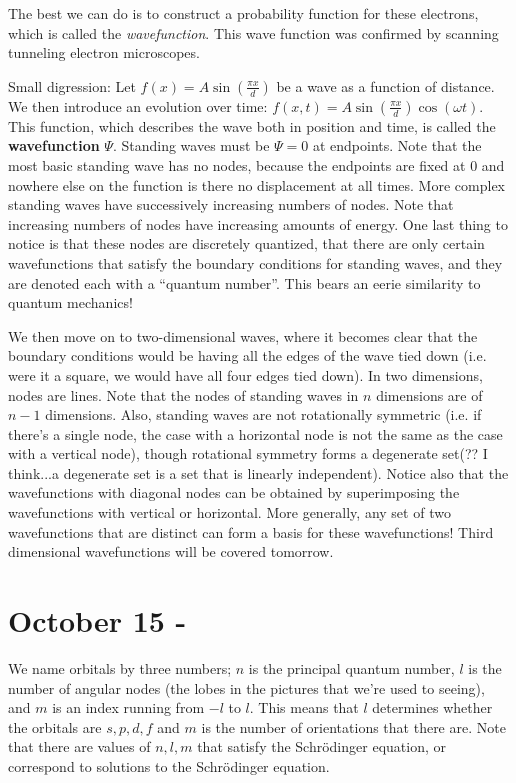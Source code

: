 \documentclass{report}
\begin{document}
The best we can do is to construct a probability function for these electrons, which is called the \emph{wavefunction}. This wave function was confirmed by scanning tunneling electron microscopes. 

Small digression: Let $f(x) = A \sin(\frac{\pi x}{d})$ be a wave as a function of distance. We then introduce an evolution over time: $f(x,t) = A \sin(\frac{\pi x}{d}) \cos(\omega t)$. This function, which describes the wave both in position and time, is called the \textbf{wavefunction} $\Psi$. Standing waves must be $\Psi = 0$ at endpoints. Note that the most basic standing wave has no nodes, because the endpoints are fixed at $0$ and nowhere else on the function is there no displacement at all times. More complex standing waves have successively increasing numbers of nodes. Note that increasing numbers of nodes have increasing amounts of energy. One last thing to notice is that these nodes are discretely quantized, that there are only certain wavefunctions that satisfy the boundary conditions for standing waves, and they are denoted each with a "`quantum number"'. This bears an eerie similarity to quantum mechanics!

We then move on to two-dimensional waves, where it becomes clear that the boundary conditions would be having all the edges of the wave tied down (i.e. were it a square, we would have all four edges tied down). In two dimensions, nodes are lines. Note that the nodes of standing waves in $n$ dimensions are of $n-1$ dimensions. Also, standing waves are not rotationally symmetric (i.e. if there's a single node, the case with a horizontal node is not the same as the case with a vertical node), though rotational symmetry forms a degenerate set(?? I think...a degenerate set is a set that is linearly independent). Notice also that the wavefunctions with diagonal nodes can be obtained by superimposing the wavefunctions with vertical or horizontal. More generally, any set of two wavefunctions that are distinct can form a basis for these wavefunctions! Third dimensional wavefunctions will be covered tomorrow.

\chapter{October 15 - }

We name orbitals by three numbers; $n$ is the principal quantum number, $l$ is the number of angular nodes (the lobes in the pictures that we're used to seeing), and $m$ is an index running from $-l$ to $l$. This means that $l$ determines whether the orbitals are $s,p,d,f$ and $m$ is the number of orientations that there are. Note that there are values of $n, l, m$ that satisfy the Schr\"odinger equation, or correspond to solutions to the Schr\"odinger equation. 
\end{document}

